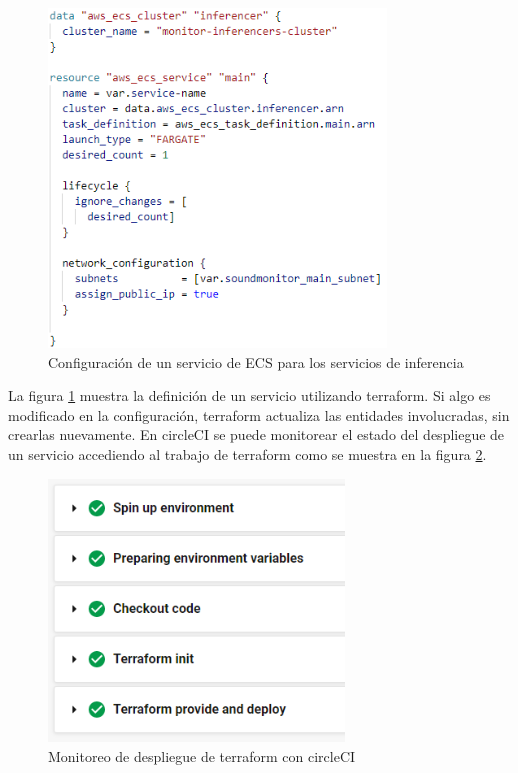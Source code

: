 \begin{figure}[H]
	\centering
	\includegraphics[width=0.8\textwidth]{bibliografia/Imagenes/infrastructure-providing.png}
	\caption{Configuración de un servicio de ECS para los servicios de inferencia}
	\label{ecsprovide}
\end{figure}

La figura \ref{ecsprovide} muestra la definición de un servicio utilizando terraform. Si algo es modificado en la configuración, terraform actualiza las entidades involucradas, sin crearlas nuevamente. En circleCI se puede monitorear el estado del despliegue de un servicio accediendo al trabajo de terraform como se muestra en la figura \ref{circleCITerraform}.

\begin{figure}[H]
	\centering
	\includegraphics[width=0.7\textwidth]{bibliografia/Imagenes/circleCITerraformJob.png}
	\caption{Monitoreo de despliegue de terraform con circleCI}
	\label{circleCITerraform}
\end{figure}




